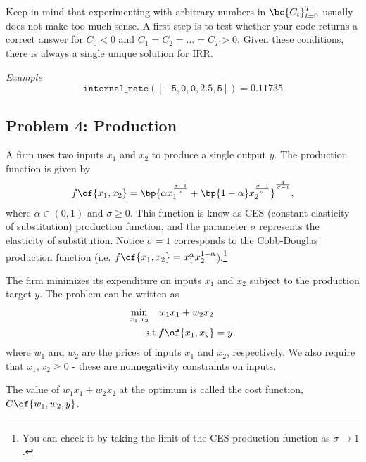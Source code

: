 \documentclass[english,hyperref={pdftex,pdfpagemode=UseNone,hidelinks}]{tufte-handout}
\begin{document}
Keep in mind that experimenting with arbitrary numbers in $\bc{C_t}_{t=0}^T$ usually does not make too much sense. A first step is to test whether your code returns a correct answer for $C_0<0$ and $C_1 = C_2 = ... = C_T > 0$. Given these conditions, there is always a single unique solution for IRR. 

\textit{Example}
$$\mathtt{internal \_ rate([-5,0,0,2.5,5])} = 0.11735$$

\subsection*{Problem 4: Production}

A firm uses two inputs $x_1$ and $x_2$ to produce a single output $y$. The production function is given by \begin{align*}
    f\of{x_1,x_2} = \bp{\alpha x_1^{\frac{\sigma-1}{\sigma}} + \bp{1-\alpha}x_2^{\frac{\sigma-1}{\sigma}}}^{\frac{\sigma}{\sigma-1}},
\end{align*}
where $\alpha \in (0,1)$ and $\sigma \geq 0$. This function is know as CES (constant elasticity of substitution) production function, and the parameter $\sigma$ represents the elasticity of substitution. 
Notice $\sigma=1$ corresponds to the Cobb-Douglas production function (i.e. $f\of{x_1,x_2} = x_1^\alpha x_2^{1-\alpha}$).\footnote{You can check it by taking the limit of the CES production function as $\sigma \rightarrow 1$.} 

The firm minimizes its expenditure on inputs $x_1$ and $x_2$ subject to the production target $y$. The problem can be written as 
\begin{align*}
    \min_{x_1,x_2} \quad  & w_1 x_1 + w_2 x_2 \\
    \text{s.t.} & f\of{x_1,x_2} = y,
\end{align*}
where $w_1$ and $w_2$ are the prices of inputs $x_1$ and $x_2$, respectively. We also require that $x_1,x_2 \geq 0$ - these are nonnegativity constraints on inputs.

The value of $w_1 x_1 + w_2 x_2$ at the optimum is called the cost function, $C\of{w_1,w_2,y}$.
\end{document}
